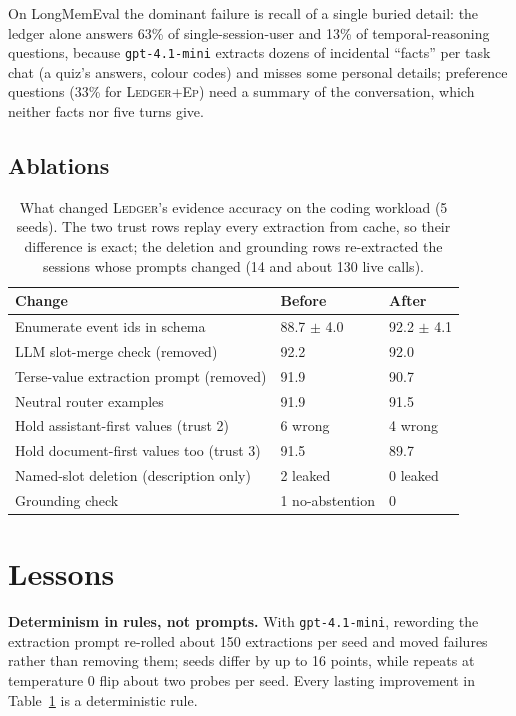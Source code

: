 \documentclass[10pt,conference]{IEEEtran}
\newcommand{\sys}{\textsc{Ledger}}
\newcommand{\hyb}{\textsc{Ledger+Ep}}
\begin{document}
On LongMemEval the dominant failure is recall of a single buried detail: the
ledger alone answers 63\% of single-session-user and 13\% of
temporal-reasoning questions, because \texttt{gpt-4.1-mini} extracts dozens of
incidental ``facts'' per task chat (a quiz's answers, colour codes) and misses
some personal details; preference questions (33\% for \hyb{}) need a summary
of the conversation, which neither facts nor five turns give.

\subsection{Ablations}

\begin{table}[t]
\caption{What changed \sys{}'s evidence accuracy on the coding workload
(5 seeds). The two trust rows replay every extraction from cache, so their
difference is exact; the deletion and grounding rows re-extracted the sessions
whose prompts changed (14 and about 130 live calls).}
\label{tab:ablation}
\centering
\footnotesize
\begin{tabular}{@{}lll@{}}
\toprule
Change & Before & After \\
\midrule
Enumerate event ids in schema & 88.7 $\pm$ 4.0 & 92.2 $\pm$ 4.1 \\
LLM slot-merge check (removed) & 92.2 & 92.0 \\
Terse-value extraction prompt (removed) & 91.9 & 90.7 \\
Neutral router examples & 91.9 & 91.5 \\
\midrule
Hold assistant-first values (trust 2) & 6 wrong & 4 wrong \\
Hold document-first values too (trust 3) & 91.5 & 89.7 \\
Named-slot deletion (description only) & 2 leaked & 0 leaked \\
Grounding check & 1 no-abstention & 0 \\
\bottomrule
\end{tabular}
\end{table}

\section{Lessons}
\label{sec:lessons}

\textbf{Determinism in rules, not prompts.} With \texttt{gpt-4.1-mini},
rewording the extraction prompt re-rolled about 150 extractions per seed and
moved failures rather than removing them; seeds differ by up to 16 points,
while repeats at temperature 0 flip about two probes per seed. Every lasting
improvement in Table~\ref{tab:ablation} is a deterministic rule.
\end{document}
